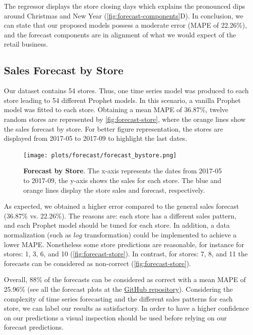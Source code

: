 The regressor displays the store closing days which explains the pronounced dips around Christmas and New Year (\autoref{fig:forecast-components}D). In conclusion, we can state that our proposed models possess a moderate error (MAPE of 22.26\%), and the forecast components are in alignment of what we would expect of the retail business.   

\subsection[Sales Forecast by Store]{Sales Forecast by Store}
\label{sec:forecast-store}

Our dataset contains 54 stores. Thus, one time series model was produced to each store leading to 54 different Prophet models. In this scenario, a vanilla Prophet model was fitted to each store. Obtaining a mean MAPE of 36.87\%, twelve random stores are represented by \autoref{fig:forecast-store}, where the orange lines show the sales forecast by store. For better figure representation, the stores are displayed from 2017-05 to 2017-09 to highlight the last dates. 

\begin{figure}[!htb]
  \centering
  \texttt{[image: plots/forecast/forecast\_bystore.png]}
  \caption[Forecast by Store]{\textbf{Forecast by Store}. The x-axis represents the dates from 2017-05 to 2017-09, the y-axis shows the sales for each store. The blue and orange lines display the store sales and forecast, respectively.}
  \label{fig:forecast-store}
\end{figure}

As expected, we obtained a higher error compared to the general sales forecast (36.87\% vs. 22.26\%). The reasons are: each store has a different sales pattern, and each Prophet model should be tuned for each store. In addition, a data normalization (such as $log$ transformation) could be implemented to achieve a lower MAPE. Nonetheless some store predictions are reasonable, for instance for stores: 1, 3, 6, and 10 (\autoref{fig:forecast-store}). In contrast, for stores: 7, 8, and 11 the forecasts can be considered as non-correct (\autoref{fig:forecast-store}).

Overall, 88\% of the forecasts can be considered as correct with a mean MAPE of 25.96\% (see all the forecast plots at the \href{https://github.com/razielar/forecasting_retail-store}{GitHub repository}). Considering the complexity of time series forecasting and the different sales patterns for each store, we can label our results as satisfactory. In order to have a higher confidence on our predictions a visual inspection should be used before relying on our forecast predictions.

